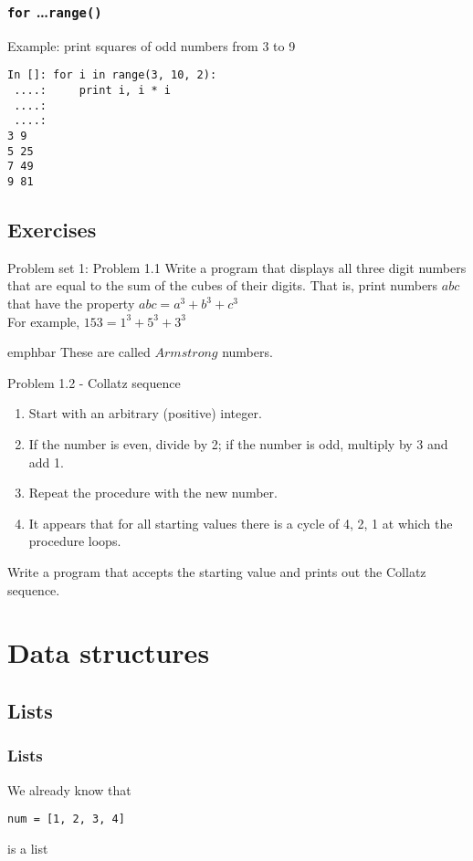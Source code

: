 \documentclass[14pt,compress]{beamer}
\newcommand{\emphbar}[1]
{\begin{beamercolorbox}[rounded=true]{emphbar} 
      {#1}
 \end{beamercolorbox}
}
\newcounter{time}
\newcommand{\inctime}[1]{\addtocounter{time}{#1}{\tiny \thetime\ m}}
\newcommand{\typ}[1]{\lstinline{#1}}
\begin{document}
\begin{frame}[fragile]
  \frametitle{\texttt{for} \ldots \typ{range()}}
Example: print squares of odd numbers from 3 to 9
  \begin{lstlisting}
In []: for i in range(3, 10, 2):
 ....:     print i, i * i
 ....:
 ....:
3 9
5 25
7 49
9 81
\end{lstlisting}
\inctime{5}
\end{frame}

\subsection{Exercises}

\begin{frame}{Problem set 1: Problem 1.1}
  Write a program that displays all three digit numbers that are equal to the sum of the cubes of their digits. That is, print numbers $abc$ that have the property $abc = a^3 + b^3 + c^3$\\
For example, $153 = 1^3 + 5^3 + 3^3$\\
\vspace*{0.2in}
\emphbar{These are called $Armstrong$ numbers.}
\end{frame}

\begin{frame}{Problem 1.2 - Collatz sequence}
\begin{enumerate}
  \item Start with an arbitrary (positive) integer. 
  \item If the number is even, divide by 2; if the number is odd, multiply by 3 and add 1.
  \item Repeat the procedure with the new number.
  \item It appears that for all starting values there is a cycle of 4, 2, 1 at which the procedure loops.
\end{enumerate}
    Write a program that accepts the starting value and prints out the Collatz sequence.
\inctime{5}
\end{frame}

\section{Data structures}
\subsection{Lists}
\begin{frame}[fragile]
  \frametitle{Lists}
\begin{block}{We already know that}
  \begin{lstlisting}
num = [1, 2, 3, 4]
  \end{lstlisting}
is a list
\end{block}
\end{frame}
\end{document}

